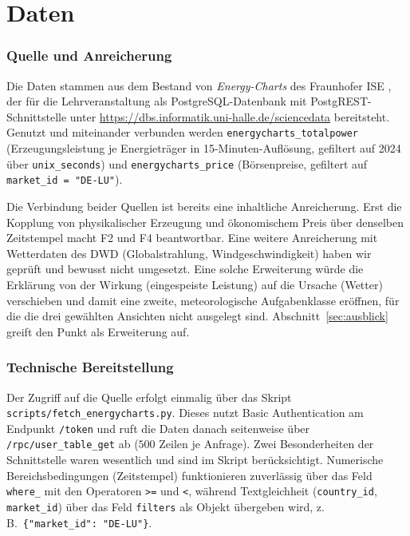 \section{Daten}\label{sec:daten}

\subsubsection*{Quelle und Anreicherung}

Die Daten stammen aus dem Bestand von \emph{Energy-Charts} des Fraunhofer ISE \cite{EnergyCharts},
der für die Lehrveranstaltung als PostgreSQL-Datenbank mit PostgREST-Schnittstelle
\cite{PostgREST} unter \url{https://dbs.informatik.uni-halle.de/sciencedata} bereitsteht. Genutzt
und miteinander verbunden werden \texttt{energycharts\_totalpower} (Erzeugungsleistung je
Energieträger in 15-Minuten-Auflösung, gefiltert auf 2024 über \texttt{unix\_seconds}) und
\texttt{energycharts\_price} (Börsenpreise, gefiltert auf \texttt{market\_id = "DE-LU"}).

Die Verbindung beider Quellen ist bereits eine inhaltliche Anreicherung. Erst die Kopplung von
physikalischer Erzeugung und ökonomischem Preis über denselben Zeitstempel macht F2 und F4
beantwortbar. Eine weitere Anreicherung mit Wetterdaten des DWD (Globalstrahlung,
Windgeschwindigkeit) haben wir geprüft und bewusst nicht umgesetzt. Eine solche Erweiterung würde die
Erklärung von der Wirkung (eingespeiste Leistung) auf die Ursache (Wetter) verschieben und damit eine
zweite, meteorologische Aufgabenklasse eröffnen, für die die drei gewählten Ansichten nicht ausgelegt sind.
Abschnitt~\ref{sec:ausblick} greift den Punkt als Erweiterung auf.

\subsubsection*{Technische Bereitstellung}

Der Zugriff auf die Quelle erfolgt einmalig über das Skript
\texttt{scripts/fetch\_energycharts.py}. Dieses nutzt Basic Authentication am Endpunkt \texttt{/token}
und ruft die Daten danach seitenweise über \texttt{/rpc/user\_table\_get} ab ($500$ Zeilen je Anfrage).
Zwei Besonderheiten der Schnittstelle waren wesentlich und sind im Skript berücksichtigt. Numerische
Bereichsbedingungen (Zeitstempel) funktionieren zuverlässig über das Feld \texttt{where\_} mit den
Operatoren \texttt{>=} und \texttt{<}, während Textgleichheit (\texttt{country\_id}, \texttt{market\_id})
über das Feld \texttt{filters} als Objekt übergeben wird, z.\,B.\ \texttt{\{"market\_id": "DE-LU"\}}.

